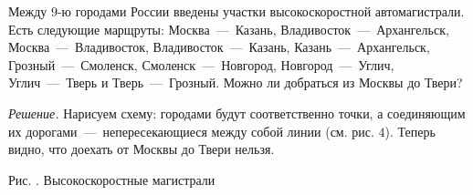 \begin{example}
	Между $9$-ю городами России введены участки высокоскоростной автомагистрали. Есть следующие марщруты: 
	Москва~---~Казань, Владивосток~---~Архангельск, Москва~---~Владивосток, Владивосток~---~Казань, Казань~---~Архангельск, 
	Грозный~---~Смоленск, Смоленск~---~Новгород, Новгород~---~Углич, Углич~---~Тверь и Тверь~---~Грозный. 
	Можно ли добраться из Москвы до Твери?

	\emph{Решение.} Нарисуем схему: городами будут соответственно точки, а соединяющим их дорогами~---~непересекающиеся
	между собой линии (см. рис. $4$). Теперь видно, что доехать от Москвы до Твери нельзя.

\begin{center}
\end{center}
\begin{center}
	\small Рис. \images. Высокоскоростные магистрали
\end{center}
\end{example}

